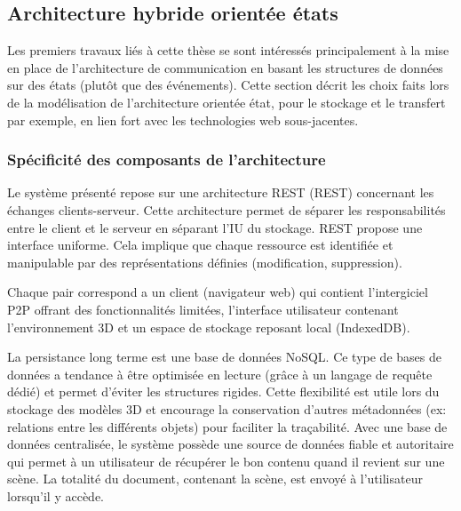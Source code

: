 \subsection{Architecture hybride \og orientée états\fg{}}
\label{sec:comm_state}

Les premiers travaux liés à cette thèse \cite{Desprat2015a,Desprat2015b} se sont 
intéressés principalement à la mise en place de l'architecture de communication 
en basant les structures de données sur des états (plutôt que des événements). 
Cette section décrit les choix faits lors de la modélisation de l'architecture \og 
orientée état\fg{}, pour le stockage et le transfert par exemple, en lien fort avec les 
technologies web sous-jacentes. 

%  
\subsubsection{Spécificité des composants de l'architecture}
Le système présenté repose sur une architecture \acrshort{REST} 
(\acrlong{REST}) concernant les échanges clients-serveur. Cette architecture 
permet de séparer les responsabilités entre le client et le serveur en séparant 
l'\gls{IU} du stockage. \gls{REST} propose une interface uniforme. Cela implique 
que chaque ressource est identifiée et manipulable par des représentations définies 
(modification, suppression). 

Chaque pair correspond a un client (navigateur web) qui contient l'intergiciel 
\gls{P2P} offrant des fonctionnalités limitées, l'interface utilisateur contenant 
l'environnement \gls{3D} et un espace de stockage reposant local (IndexedDB).

La persistance long terme est une base de données NoSQL. Ce type de bases de 
données a tendance à être optimisée en lecture (grâce à un 
langage de requête dédié) et permet d'éviter les 
structures rigides. Cette flexibilité est utile lors du stockage des modèles \gls{3D} 
et 
encourage la conservation d'autres métadonnées (ex: relations entre les différents 
objets) pour faciliter la traçabilité. 
Avec une base de données centralisée, le système possède une source de 
données fiable et autoritaire qui permet à un utilisateur de récupérer le bon contenu 
quand il revient sur une scène. La totalité du document, contenant la scène, est 
envoyé à l'utilisateur lorsqu'il y accède.


